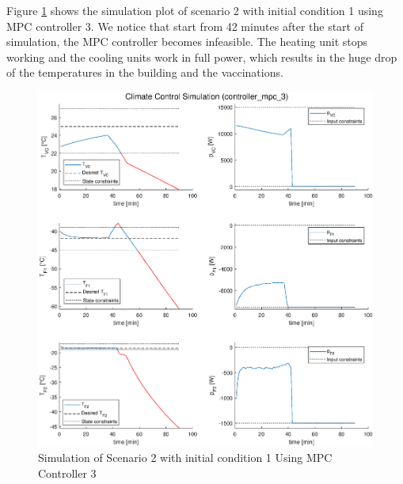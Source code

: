 \documentclass[a4paper,twoside,11pt]{article}
\numberwithin{equation}{section}
\begin{document}
Figure \ref{fig:15} shows the simulation plot of scenario 2 with initial condition 1 using MPC controller 3. We notice that start from 42 minutes after the start of simulation, the MPC controller becomes infeasible. The heating unit stops working and the cooling units work in full power, which results in the huge drop of the temperatures in the building and the vaccinations. 

\begin{figure}[ht]
\centering
\includegraphics[scale = 0.58]{image/17.eps}
\caption{Simulation of Scenario 2 with initial condition 1 Using MPC Controller 3}
\label{fig:15}
\end{figure}
\end{document}
